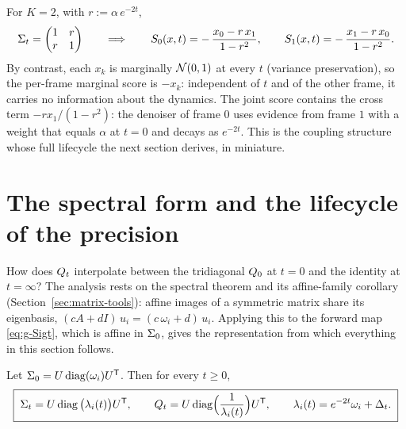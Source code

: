 For $K = 2$, with $r := \alpha\, e^{-2t}$,
\begin{equation}
  \Sigma_t = \begin{pmatrix} 1 & r \\ r & 1 \end{pmatrix}
  \qquad\Longrightarrow\qquad
  S_0(x, t) = -\,\frac{x_0 - r\, x_1}{1 - r^2},
  \qquad
  S_1(x, t) = -\,\frac{x_1 - r\, x_0}{1 - r^2}.
  \label{eq:g-K2-score}
\end{equation}
By contrast, each $x_k$ is marginally $\mathcal{N}(0,1)$ at every $t$ (variance
preservation), so the per-frame marginal score is $-x_k$: independent of
$t$ and of the other frame, it carries no information about the dynamics.
The joint score contains the cross term $-r x_1/(1-r^2)$: the denoiser of
frame $0$ uses evidence from frame $1$ with a weight that equals $\alpha$
at $t = 0$ and decays as $e^{-2t}$. This is the coupling structure whose
full lifecycle the next section derives, in miniature.

\section{The spectral form and the lifecycle of the precision}
\label{sec:g-lifecycle}

How does $Q_t$ interpolate between the tridiagonal $Q_0$ at $t = 0$ and
the identity at $t = \infty$? The analysis rests on the spectral theorem
and its affine-family corollary (Section~\ref{sec:matrix-tools}): affine
images of a symmetric matrix share its eigenbasis,
$(cA + dI)\, u_i = (c\,\omega_i + d)\, u_i$. Applying this to the
forward map \eqref{eq:g-Sigt}, which is affine in $\Sigma_0$, gives the
representation from which everything in this section follows.

\begin{theorem}\label{thm:g-three-forms}
Let $\Sigma_0 = U \operatorname{diag}(\omega_i) U^{\mathsf{T}}$. Then for every
$t \geq 0$,
\begin{equation}
  \boxed{\;
  \Sigma_t = U \operatorname{diag}\big( \lambda_i(t) \big) U^{\mathsf{T}},
  \qquad
  Q_t = U \operatorname{diag}\!\Big( \frac{1}{\lambda_i(t)} \Big) U^{\mathsf{T}},
  \qquad
  \lambda_i(t) = e^{-2t} \omega_i + \Delta_t .
  \;}
  \label{eq:g-Qt-spec}
\end{equation}
\end{theorem}

